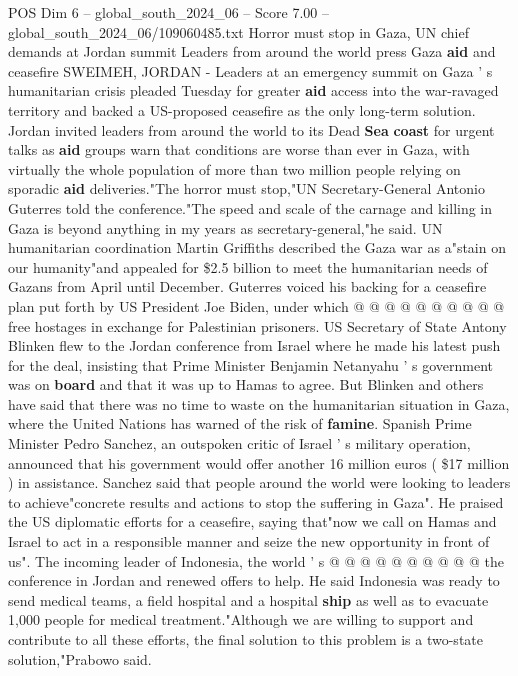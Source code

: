 \begin{textsample}{POS Dim 6 – global\_south\_2024\_06 – Score 7.00 – global\_south\_2024\_06/109060485.txt}  \label{ex:f6_pos_173}
Horror must stop in Gaza, UN chief demands at Jordan summit Leaders from around the world press Gaza \textbf{aid} and ceasefire SWEIMEH, JORDAN - Leaders at an emergency summit on Gaza ' s humanitarian crisis pleaded Tuesday for greater \textbf{aid} access into the war-ravaged territory and backed a US-proposed ceasefire as the only long-term solution.
Jordan invited leaders from around the world to its Dead \textbf{Sea} \textbf{coast} for urgent talks as \textbf{aid} groups warn that conditions are worse than ever in Gaza, with virtually the whole population of more than two million people relying on sporadic \textbf{aid} deliveries."The horror must stop,"UN Secretary-General Antonio Guterres told the conference."The speed and scale of the carnage and killing in Gaza is beyond anything in my years as secretary-general,"he said.
UN humanitarian coordination Martin Griffiths described the Gaza war as a"stain on our humanity"and appealed for \$2.5 billion to meet the humanitarian needs of Gazans from April until December.
Guterres voiced his backing for a ceasefire plan put forth by US President Joe Biden, under which @ @ @ @ @ @ @ @ @ @ free hostages in exchange for Palestinian prisoners.
US Secretary of State Antony Blinken flew to the Jordan conference from Israel where he made his latest push for the deal, insisting that Prime Minister Benjamin Netanyahu ' s government was on \textbf{board} and that it was up to Hamas to agree.
But Blinken and others have said that there was no time to waste on the humanitarian situation in Gaza, where the United Nations has warned of the risk of \textbf{famine}.
Spanish Prime Minister Pedro Sanchez, an outspoken critic of Israel ' s military operation, announced that his government would offer another 16 million euros ( \$17 million ) in assistance.
Sanchez said that people around the world were looking to leaders to achieve"concrete results and actions to stop the suffering in Gaza".
He praised the US diplomatic efforts for a ceasefire, saying that"now we call on Hamas and Israel to act in a responsible manner and seize the new opportunity in front of us".
The incoming leader of Indonesia, the world ' s @ @ @ @ @ @ @ @ @ @ the conference in Jordan and renewed offers to help.
He said Indonesia was ready to send medical teams, a field hospital and a hospital \textbf{ship} as well as to evacuate 1,000 people for medical treatment."Although we are willing to support and contribute to all these efforts, the final solution to this problem is a two-state solution,"Prabowo said.

\end{textsample}
